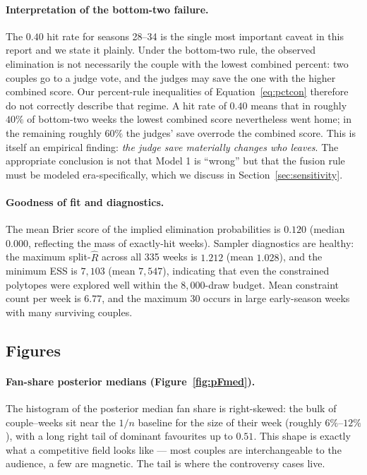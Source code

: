 \documentclass{article}
\begin{document}
\paragraph{Interpretation of the bottom-two failure.} The $0.40$ hit rate for seasons
28--34 is the single most important caveat in this report and we state it plainly. Under
the bottom-two rule, the observed elimination is not necessarily the couple with the lowest
combined percent: two couples go to a judge vote, and the judges may save the one with the
higher combined score. Our percent-rule inequalities of Equation~\eqref{eq:pctcon} therefore
do not correctly describe that regime. A hit rate of $0.40$ means that in roughly $40\%$ of
bottom-two weeks the lowest combined score nevertheless went home; in the remaining
roughly $60\%$ the judges' save overrode the combined score. This is itself an empirical
finding: \emph{the judge save materially changes who leaves}. The appropriate conclusion is
not that Model 1 is ``wrong'' but that the fusion rule must be modeled era-specifically,
which we discuss in Section~\ref{sec:sensitivity}.

\paragraph{Goodness of fit and diagnostics.} The mean Brier score of the implied
elimination probabilities is $0.120$ (median $0.000$, reflecting the mass of exactly-hit
weeks). Sampler diagnostics are healthy: the maximum split-$\hat R$ across all 335 weeks is
$1.212$ (mean $1.028$), and the minimum ESS is $7{,}103$ (mean $7{,}547$), indicating that
even the constrained polytopes were explored well within the $8{,}000$-draw budget. Mean
constraint count per week is $6.77$, and the maximum $30$ occurs in large early-season
weeks with many surviving couples.

\subsection{Figures}

\paragraph{Fan-share posterior medians (Figure~\ref{fig:pFmed}).} The histogram of the
posterior median fan share is right-skewed: the bulk of couple--weeks sit near the
$1/n$ baseline for the size of their week (roughly $6\%$--$12\%$), with a long right tail
of dominant favourites up to $0.51$. This shape is exactly what a competitive field
looks like --- most couples are interchangeable to the audience, a few are magnetic. The
tail is where the controversy cases live.
\end{document}
